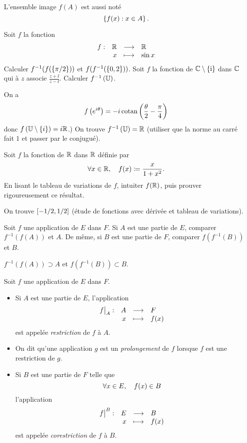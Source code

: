 \documentclass{magnoliaold}
\begin{document}
\begin{remarqueUnique}
\remarque L'ensemble image $f(A)$ est aussi noté
  \[\left\{f(x) : x\in A\right\}.\]
\end{remarqueUnique}

\begin{exos}
\exo Soit $f$ la fonction
  \[\begin{array}[t]{lrcl} \displaystyle{f} : & \displaystyle{\mathbb{R}} & \longrightarrow & \displaystyle{\mathbb{R}} \\ & \displaystyle{x} & \longmapsto & \displaystyle{\sin x} \end{array}\]
  Calculer $f^{-1}(f(\left\{\pi/2\right\}))$ et $f(f^{-1}(\left\{0, 2\right\}))$.
\exo Soit $f$ la fonction de $\mathbb{C}\setminus\left\{{\rm i}\right\}$ dans $\mathbb{C}$ qui à $z$
  associe $\frac{z+\ii}{z-\ii}$. Calculer %
  $f^\applirec \p{\U}$.
  \begin{sol}
  On a
  \[f\left(e^{i\theta}\right)=-i\operatorname{cotan}\left(\frac{\theta}{2}-\frac{\pi}{4}\right)\]
  donc $f\p{\U\setminus\ens{i}}=i\R$.) On trouve $f^\applirec \p{\U}=\R$
  (utiliser que la norme au carré fait $1$ et passer par le conjugué).
  \end{sol}
\exo Soit $f$ la fonction de $\mathbb{R}$ dans $\mathbb{R}$ définie par
  \[\forall x\in\mathbb{R} ,\quad f(x)\coloneqq\frac{x}{1+x^2}.\]
  En lisant le tableau de variations de $f$, intuiter $f(\mathbb{R})$, puis
  prouver rigoureusement ce résultat.
  \begin{sol}
  On trouve $\left[-1/2,1/2\right]$ (étude de fonctions avec dérivée et tableau de variations).
  \end{sol}
\exo Soit $f$ une application de $E$ dans $F$. Si $A$ est une partie de $E$,
  comparer $f^{-1}(f(A))$ et $A$. De même, si $B$ est une partie de $F$,
  comparer $f(f^{-1}(B))$ et $B$.  
 \begin{sol}
 $f^{-1}(f(A))\supset A$ et $f(f^{-1}(B))\subset B$.
 \end{sol}
\end{exos}


\begin{definition}[utile=-3]
Soit $f$ une application de $E$ dans $F$.
\begin{itemize}
\item Si $A$ est une partie de $E$, l'application
  \[\dspappli{\restri{f}{A}}{A}{F}{x}{f(x)}\]
  est appelée \emph{restriction} de $f$ à $A$.
\item On dit qu'une application $g$ est un
  \emph{prolongement} de $f$ lorsque $f$ est une restriction de $g$.
\item Si $B$ est une partie de $F$ telle que
  \[\forall x\in E ,\quad f(x)\in B\]
  l'application
  \[\dspappli{\corestri{f}{B}}{E}{B}{x}{f(x)}\]
  est appelée \emph{corestriction} de $f$ à $B$.
\end{itemize}
\end{definition}
\end{document}
